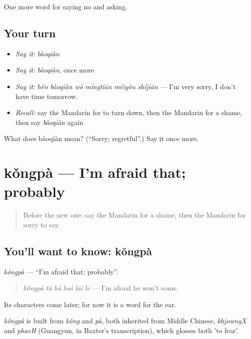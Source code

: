 \begin{grammarlens}[title={What you've built}]
One more word for saying no and asking.
\end{grammarlens}

\subsection*{Your turn}
\begin{itemize}
\raggedright
  \item \emph{Say it:} \emph{bàoqiàn}
  \item \emph{Say it:} \emph{bàoqiàn}, once more
  \item \emph{Say it:} \emph{hěn bàoqiàn wǒ míngtiān méiyǒu shíjiān} — I'm very sorry, I don't have time tomorrow.
  \item \emph{Recall:} say the Mandarin for to turn down, then the Mandarin for a shame, then say \emph{bàoqiàn} again
\end{itemize}

\begin{tcolorbox}[breakable,colback=teal!4,colframe=teal!35!black,title={Before you move on}]
What does bàoqiàn mean? (\textquotedblleft{}Sorry; regretful\textquotedblright{}.) Say it once more.
\end{tcolorbox}
\section[kǒngpà]{kǒngpà — I'm afraid that; probably}

\label{lesson:ZH-C264-kongpa}



\begin{quote}
Before the new one: say the Mandarin for a shame, then the Mandarin for sorry to say.
\end{quote}

\subsection*{You'll want to know: kǒngpà}
\emph{kǒngpà} — \textquotedblleft{}I'm afraid that; probably\textquotedblright{}.

\begin{quote}
\emph{kǒngpà tā bú huì lái le} — I'm afraid he won't come.
\end{quote}

Its characters come later; for now it is a word for the ear.

\begin{cousinweb}
\emph{kǒngpà} is built from \emph{kǒng} and \emph{pà}, both inherited from Middle Chinese, \emph{khjowngX} and \emph{phaeH} (Guangyun, in Baxter's transcription), which glosses both 'to fear'.
\end{cousinweb}

